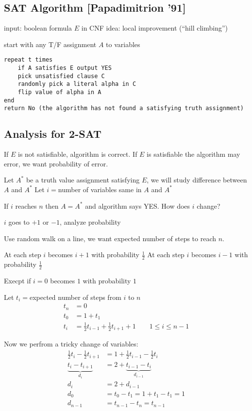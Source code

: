 \documentclass[english,12pt]{article}
\theoremstyle{plain}
\theoremstyle{definition}
\theoremstyle{definition} %
\begin{document}
\subsection{SAT Algorithm [Papadimitrion '91]}
input: boolean formula $E$ in CNF
idea: local improvement (``hill climbing'')

start with any T/F assignment $A$ to variables
\begin{verbatim}
repeat t times
    if A satisfies E output YES
    pick unsatisfied clause C
    randomly pick a literal alpha in C
    flip value of alpha in A
end
return No (the algorithm has not found a satisfying truth assignment)
\end{verbatim}

\subsection{Analysis for 2-SAT}
If $E$ is not satisfiable, algorithm is correct.
If $E$ is satisfiable the algorithm may error, we want probability of error.

Let $A^\ast$ be a truth value assignment satisfying $E$, we will study difference between $A$ and $A^\ast$
Let $i=$number of variables same in $A$ and $A^\ast$

If $i$ reaches $n$ then $A=A^\ast$ and algorithm says YES.  How does $i$ change?

$i$ goes to $+1$ or $-1$, analyze probability

Use random walk on a line, we want expected number of steps to reach $n$.

At each step $i$ becomes $i+1$ with probability $\frac{1}{2}$
At each step $i$ becomes $i-1$ with probability $\frac{1}{2}$

Execpt if $i=0$ becomes $1$ with probability $1$

Let $t_i=$expected number of steps from $i$ to $n$
\begin{align*}
t_n&=0\\
t_0&=1+t_1\\
t_i&=\frac{1}{2}t_{i-1}+\frac{1}{2}t_{i+1}+1\qquad 1\le i\le n-1
\end{align*}

Now we perfrom a tricky change of variables:
\begin{align*}
\frac{1}{2}t_i - \frac{1}{2}t_{i+1}&=1+\frac{1}{2}t_{i-1}-\frac{1}{2}t_i\\
\underbrace{t_i-t_{i+1}}_{d_i}&=2+\underbrace{t_{i-1}-t_{i}}_{d_{i-1}}\\
d_i&=2+d_{i-1}\\
d_0&=t_0-t_1
=1+t_1-t_1
=1\\
d_{n-1}&=t_{n-1}-t_n
=t_{n-1}
\end{align*}
\end{document}
